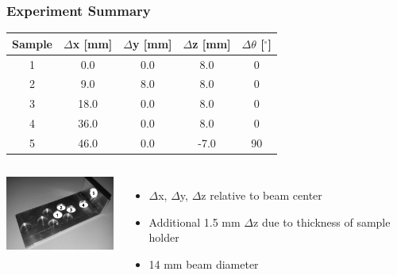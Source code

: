 \documentclass[12pt,xcolor=dvipsnames]{beamer}
\begin{document}
\begin{frame}
\frametitle{Experiment Summary}
\begin{center}
\begin{tabular}{c|cccc}
\hline 
Sample & $\Delta$x [mm] & $\Delta$y [mm] & $\Delta$z [mm] & $\Delta \theta$ [$^{\circ}$] \\ 
\hline 
1 & 0.0 & 0.0 & 8.0 & 0 \\ 
2 & 9.0 & 8.0 & 8.0 & 0 \\ 
3 & 18.0 & 0.0 & 8.0 & 0 \\ 
4 & 36.0 & 0.0 & 8.0 & 0 \\ 
5 & 46.0 & 0.0 & -7.0 & 90 \\ 
\hline 
\end{tabular}
\end{center}
\begin{columns}[c]
\column{1.5in}
\includegraphics[width=1.5in]{sample_holder.jpg}
\column{2.5in}
\begin{itemize}
\item $\Delta$x, $\Delta$y, $\Delta$z relative to beam center
\item Additional 1.5 mm $\Delta$z due to thickness of sample holder
\item 14 mm beam diameter
\end{itemize}
\end{columns}
\end{frame}
\end{document}
